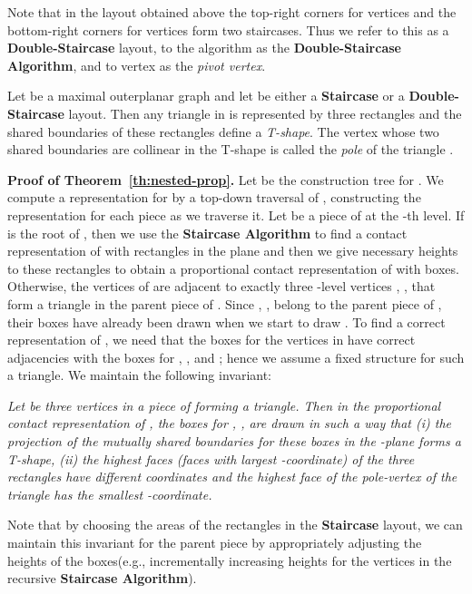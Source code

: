 \documentclass{llncs}
\begin{document}
Note that in the layout obtained above the top-right corners for vertices  and the bottom-right corners for vertices  form two staircases.
Thus we refer to this as a \textbf{Double-Staircase} layout,  to the algorithm as the \textbf{Double-Staircase Algorithm}, and to vertex  as the \textit{pivot vertex}.




Let  be a maximal outerplanar graph and let  be either a \textbf{Staircase} or
 a \textbf{Double-Staircase} layout. Then any triangle  in  is represented by three rectangles and the shared boundaries of these rectangles define a \textit{T-shape}. The vertex whose two shared boundaries are  collinear in the T-shape is called the \textit{pole} of the triangle .







\smallskip\noindent
\textbf{Proof of Theorem~\ref{th:nested-prop}.}
	Let  be the construction tree for . We compute a
	representation for  by a top-down traversal of , constructing the
	representation for each piece as we traverse it. Let  be a piece of  at the
	-th level. If  is the root of , then we use the
	\textbf{Staircase Algorithm} to find a contact representation of  with rectangles
	in the plane and then we give necessary heights to these rectangles to obtain a proportional
	contact representation of  with boxes.
Otherwise, the vertices of  are adjacent to exactly three -level vertices
	, ,  that form a triangle in the parent piece of .
	Since , ,  belong to the parent piece of , their boxes have already been
	drawn when we start to draw . To find a correct
	representation of , we need that the boxes for the vertices in  have correct
	adjacencies with the boxes for
	, , and ; hence we assume a fixed structure for such a triangle.
We maintain the following invariant:
	
	
	\textit{Let  be three vertices in a piece  of  forming a triangle.
	 Then in the proportional contact representation of , the boxes for , , 
	 are drawn in such a way that (i) the projection of the mutually shared boundaries for
	 these boxes in the -plane forms a T-shape, (ii) the highest faces (faces
	 with largest -coordinate) of the three rectangles have different  coordinates
	and the highest face of the pole-vertex of the triangle has the smallest
	 -coordinate.}

	
	Note that by choosing the areas of the rectangles in the \textbf{Staircase} layout,
	we can maintain this invariant for the parent piece by appropriately adjusting the heights of the boxes(e.g., incrementally increasing heights for the vertices in the
	recursive \textbf{Staircase Algorithm}).
	
\end{document}
